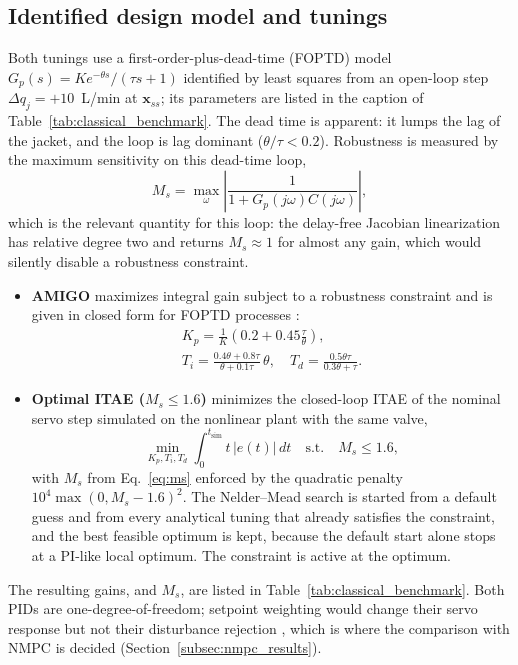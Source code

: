 \subsection{Identified design model and tunings}
\label{subsec:tunings}
Both tunings use a first-order-plus-dead-time (FOPTD) model $G_p(s) = K e^{-\theta s}/(\tau s + 1)$ identified by least squares from an open-loop step $\Delta q_j = +10$~L/min at $\mathbf{x}_{ss}$; its parameters are listed in the caption of Table~\ref{tab:classical_benchmark}. The dead time is apparent: it lumps the lag of the jacket, and the loop is lag dominant ($\theta/\tau < 0.2$). Robustness is measured by the maximum sensitivity on this dead-time loop,
\begin{equation}
    M_s = \max_\omega \left|\frac{1}{1 + G_p(j\omega)C(j\omega)}\right|,
    \label{eq:ms}
\end{equation}
which is the relevant quantity for this loop: the delay-free Jacobian linearization has relative degree two and returns $M_s \approx 1$ for almost any gain, which would silently disable a robustness constraint.
\begin{itemize}
    \item \textbf{AMIGO} maximizes integral gain subject to a robustness constraint and is given in closed form for FOPTD processes \cite{astrom2006pid}:
    \begin{equation}
        \begin{gathered}
        K_p = \frac{1}{K}\left(0.2 + 0.45\frac{\tau}{\theta}\right), \\
        T_i = \frac{0.4\theta + 0.8\tau}{\theta + 0.1\tau}\,\theta, \quad T_d = \frac{0.5\theta\tau}{0.3\theta + \tau}.
        \end{gathered}
        \label{eq:amigo}
    \end{equation}
    \item \textbf{Optimal ITAE ($M_s \le 1.6$)} minimizes the closed-loop ITAE of the nominal servo step simulated on the nonlinear plant with the same valve,
    \begin{equation}
        \min_{K_p, T_i, T_d} \int_0^{t_{\text{sim}}} t\,|e(t)|\,dt \quad \text{s.t.} \quad M_s \le 1.6,
        \label{eq:opt}
    \end{equation}
    with $M_s$ from Eq.~\eqref{eq:ms} enforced by the quadratic penalty $10^4\max(0, M_s - 1.6)^2$. The Nelder--Mead search is started from a default guess and from every analytical tuning that already satisfies the constraint, and the best feasible optimum is kept, because the default start alone stops at a PI-like local optimum. The constraint is active at the optimum.
\end{itemize}
The resulting gains, and $M_s$, are listed in Table~\ref{tab:classical_benchmark}. Both PIDs are one-degree-of-freedom; setpoint weighting would change their servo response but not their disturbance rejection \cite{astrom2006pid}, which is where the comparison with NMPC is decided (Section~\ref{subsec:nmpc_results}).

